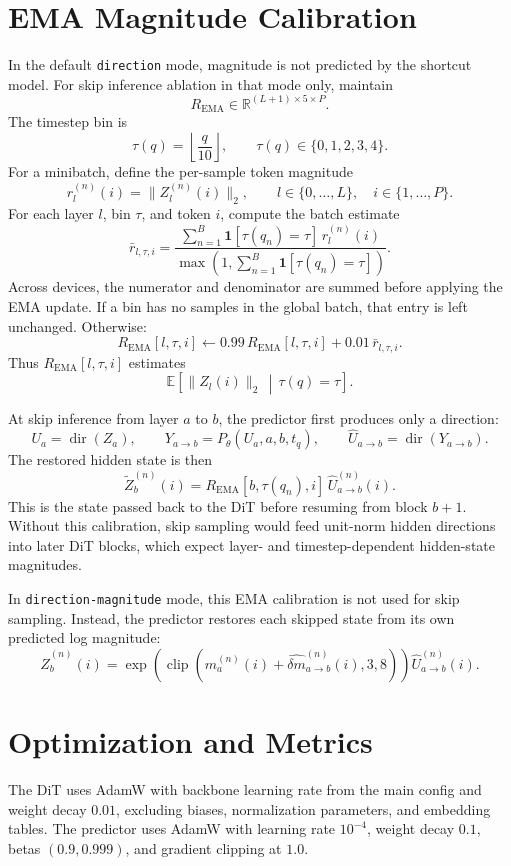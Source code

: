 \documentclass[11pt]{article}
\begin{document}
\section{EMA Magnitude Calibration}
In the default \texttt{direction} mode, magnitude is not predicted by the
shortcut model. For skip inference ablation in that mode only, maintain
\[
    R_{\mathrm{EMA}}\in\mathbb{R}^{(L+1)\times5\times P}.
\]
The timestep bin is
\[
    \tau(q)=\left\lfloor \frac{q}{10}\right\rfloor,\qquad
    \tau(q)\in\{0,1,2,3,4\}.
\]
For a minibatch, define the per-sample token magnitude
\[
    r_l^{(n)}(i)=\|Z_l^{(n)}(i)\|_2,\qquad
    l\in\{0,\ldots,L\},\quad i\in\{1,\ldots,P\}.
\]
For each layer $l$, bin $\tau$, and token $i$, compute the batch estimate
\[
    \bar r_{l,\tau,i}
    =
    \frac{
        \sum_{n=1}^{B}\mathbf{1}[\tau(q_n)=\tau]\,
        r_l^{(n)}(i)
    }{
        \max\left(1,\sum_{n=1}^{B}\mathbf{1}[\tau(q_n)=\tau]\right)
    }.
\]
Across devices, the numerator and denominator are summed before applying the
EMA update. If a bin has no samples in the global batch, that entry is left
unchanged. Otherwise:
\[
    R_{\mathrm{EMA}}[l,\tau,i]
    \leftarrow
    0.99\,R_{\mathrm{EMA}}[l,\tau,i]
    +0.01\,\bar r_{l,\tau,i}.
\]
Thus $R_{\mathrm{EMA}}[l,\tau,i]$ estimates
\[
    \mathbb{E}\!\left[\|Z_l(i)\|_2\,\middle|\,\tau(q)=\tau\right].
\]

At skip inference from layer $a$ to $b$, the predictor first produces only a
direction:
\[
    U_a=\operatorname{dir}(Z_a),\qquad
    Y_{a\rightarrow b}=P_\theta(U_a,a,b,t_q),\qquad
    \hat U_{a\rightarrow b}=\operatorname{dir}(Y_{a\rightarrow b}).
\]
The restored hidden state is then
\[
    \boxed{
    \tilde Z_b^{(n)}(i)=
    R_{\mathrm{EMA}}[b,\tau(q_n),i]\,
    \hat U_{a\rightarrow b}^{(n)}(i)
    }.
\]
This is the state passed back to the DiT before resuming from block $b+1$.
Without this calibration, skip sampling would feed unit-norm hidden directions
into later DiT blocks, which expect layer- and timestep-dependent hidden-state
magnitudes.

In \texttt{direction-magnitude} mode, this EMA calibration is not used for
skip sampling. Instead, the predictor restores each skipped state from its
own predicted log magnitude:
\[
    \hat Z_b^{(n)}(i)
    =
    \exp\!\left(
    \operatorname{clip}\left(m_a^{(n)}(i)+
    \hat{\delta m}_{a\rightarrow b}^{(n)}(i),3,8\right)
    \right)
    \hat U_{a\rightarrow b}^{(n)}(i).
\]

\section{Optimization and Metrics}
The DiT uses AdamW with backbone learning rate from the main config and
weight decay $0.01$, excluding biases, normalization parameters, and
embedding tables. The predictor uses AdamW with learning rate $10^{-4}$,
weight decay $0.1$, betas $(0.9,0.999)$, and gradient clipping at $1.0$.
\end{document}
